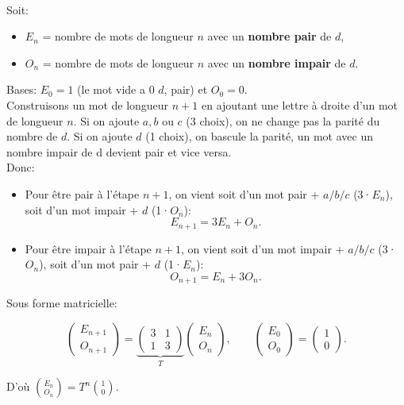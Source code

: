 \begin{solution}
    \text{ } \\
    Soit:
    \begin{itemize}
        \item $E_n$ = nombre de mots de longueur $n$ avec un \textbf{nombre pair} de $d$,
        \item $O_n$ = nombre de mots de longueur $n$ avec un \textbf{nombre impair} de $d$.
    \end{itemize}

Bases: $E_0=1$ (le mot vide a 0 $d$, pair) et $O_0=0$. \\

Construisons un mot de longueur $n\!+\!1$ en ajoutant une lettre à droite d’un mot de longueur $n$. Si on ajoute $a,b$ ou $c$ (3 choix), on ne change pas la parité du nombre de $d$. Si on ajoute $d$ (1 choix), on bascule la parité, un mot avec un nombre impair de d devient pair et vice versa. \\

Donc:
\begin{itemize}
    \item Pour être pair à l’étape $n\!+\!1$, on vient soit d’un mot pair + $a/b/c$ (3·$E_n$), soit d’un mot impair + $d$ (1·$O_n$): 
    $$
    E_{n+1}=3E_n+O_n.
    $$
    \item Pour être impair à l’étape $n\!+\!1$, on vient soit d’un mot impair + $a/b/c$ (3·$O_n$), soit d’un mot pair + $d$ (1·$E_n$):
    $$
    O_{n+1}=E_n+3O_n.
    $$
\end{itemize}

Sous forme matricielle:

$$
\begin{pmatrix}E_{n+1}\\ O_{n+1}\end{pmatrix}
=
\underbrace{\begin{pmatrix}3&1\\[2pt]1&3\end{pmatrix}}_{T}
\begin{pmatrix}E_n\\ O_n\end{pmatrix},
\qquad
\begin{pmatrix}E_0\\ O_0\end{pmatrix}=\begin{pmatrix}1\\ 0\end{pmatrix}.
$$

D’où $\binom{E_n}{O_n}=T^n\binom{1}{0}$. \\


\end{solution}
